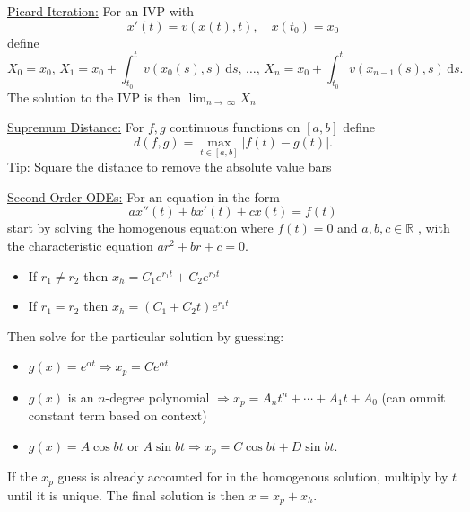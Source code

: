 \documentclass{exam}
\newcommand{\RR}{\mathbb R}
\begin{document}
    \underline{Picard Iteration:} For an IVP with 
    \[
        x'(t) = v(x(t), t), \quad x(t_0) = x_0 
    \]
    define 
    \[
        X_0 = x_0,\,
        X_1 = x_0 + \int_{t_0}^{t} v(x_0(s), s)\, \mathrm{d}s, \,\ldots,\,
        X_n = x_0 + \int_{t_0}^{t} v(x_{n-1}(s), s)\, \mathrm{d}s.
    \]
    The solution to the IVP is then $\lim_{n\to\,\infty} X_n$ 

    \underline{Supremum Distance:} For $f, g$ continuous functions on $[a, b]$ define 
    \[
        d(f, g) = \max_{t \in [a, b]} |f(t) - g(t)|.
    \]
    Tip: Square the distance to remove the absolute value bars

    \underline{Second Order ODEs:} For an equation in the form 
    \[
        ax''(t) + bx'(t) + cx(t) = f(t) 
    \]
    start by solving the homogenous equation where $f(t) = 0$ and $a, b, c \in \RR$ , with the characteristic equation $ar^2 + br + c = 0$. 

    \begin{minipage}{0.45\linewidth} 
        \begin{itemize}
            \item If $r_1 \neq r_2$ then $x_h = C_{1}e^{r_{1}t}+ C_{2}e^{r_{2}t}$
        \end{itemize}
    \end{minipage}
    \hfill
    \begin{minipage}{0.45\linewidth}
        \begin{itemize}
            \item If $r_1 = r_2$ then $x_h = (C_1 + C_2t)e^{r_{1}t}$
        \end{itemize}
    \end{minipage}

    Then solve for the particular solution by guessing:

    \begin{itemize}
        \item $g(x) = e^{\alpha t} \Rightarrow x_p = Ce^{\alpha t}$
        \item $g(x)$ is an $n$-degree polynomial $\Rightarrow x_p = A_{n}t^{n} + \cdots + A_{1}t + A_0$ (can ommit constant term based on context)
        \item $g(x) = A\cos bt$ or $A\sin bt \Rightarrow x_p = C \cos bt + D \sin bt$.
    \end{itemize}        
    If the $x_p$ guess is already accounted for in the homogenous solution, multiply by $t$ until it is unique. The final solution is then $x = x_p + x_h$.
\end{document}
